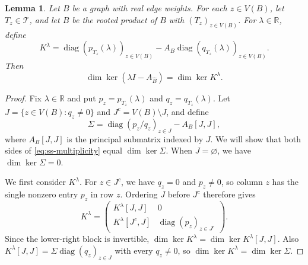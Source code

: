 \documentclass[10pt,a4paper]{article}
\theoremstyle{plain}
\newtheorem{lemma}[theorem]{Lemma}
\theoremstyle{definition}
\DeclareMathOperator{\diag}{diag}
\newcommand{\R}{\mathbb{R}}
\begin{document}
\begin{lemma}\label{lem:ss-rooted-multiplicity}
Let $B$ be a graph with real edge weights.
For each $z\in V(B)$, let $T_z\in\mathcal T$, and let $\widehat B$ be the
rooted product of $B$ with $(T_z)_{z\in V(B)}$.
For $\lambda\in\R$, define
\begin{equation}\label{eq:ss-rooted-core}
 K^\lambda=\diag(p_{T_z}(\lambda))_{z\in V(B)}
       -A_B\diag(q_{T_z}(\lambda))_{z\in V(B)}.
\end{equation}
Then
\begin{equation}\label{eq:ss-multiplicity}
 \dim\ker(\lambda I-A_{\widehat B})=\dim\ker K^\lambda.
\end{equation}
\end{lemma}
\begin{proof}
Fix $\lambda\in\R$ and put
$p_z=p_{T_z}(\lambda)$ and $q_z=q_{T_z}(\lambda)$.
Let $J=\{z\in V(B):q_z\ne0\}$ and $J^c=V(B)\setminus J$, and define
\begin{equation}\label{eq:ss-schur-core}
 \Sigma=\diag(p_z/q_z)_{z\in J}-A_{B}[J,J],
\end{equation}
where $A_{B}[J,J]$ is the principal submatrix indexed by $J$.
We will show that both sides of \cref{eq:ss-multiplicity} equal
$\dim\ker \Sigma$.
When $J=\varnothing$, we have $\dim\ker \Sigma=0$.

We first consider $K^\lambda$.
For $z\in J^c$, we have $q_z=0$ and $p_z\ne0$, so column $z$
has the single nonzero entry $p_z$ in row $z$.
Ordering $J$ before $J^c$ therefore gives
\begin{equation}\label{eq:ss-core-partition}
 K^\lambda=
 \begin{pmatrix}
 K^\lambda[J,J]&0\\
 K^\lambda[J^c,J]&\diag(p_z)_{z\in J^c}
 \end{pmatrix}.
\end{equation}
Since the lower-right block is invertible,
$\dim\ker K^\lambda=\dim\ker K^\lambda[J,J]$.
Also $K^\lambda[J,J]=\Sigma\diag(q_z)_{z\in J}$ with every $q_z\ne0$,
so $\dim\ker K^\lambda=\dim\ker \Sigma$.


\end{proof}
\end{document}
